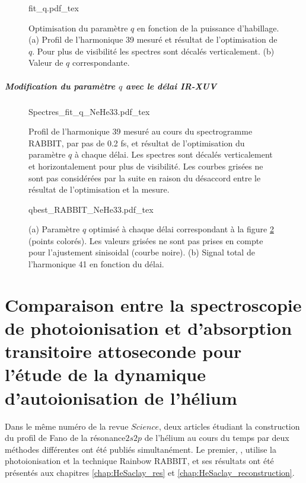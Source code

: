 \begin{figure}
\centering
\def\svgwidth{\textwidth}
{fit_q.pdf_tex}
\caption{Optimisation du paramètre $q$ en fonction de la puissance d'habillage. (a) Profil de l'harmonique 39 mesuré et résultat de l'optimisation de $q$. Pour plus de visibilité les spectres sont décalés verticalement. (b) Valeur de $q$ correspondante.}
\label{fig:fit_q}
\end{figure}

\paragraph*{Modification du paramètre $q$ avec le délai IR-XUV}
\begin{figure}[ht]
\centering
\def\svgwidth{\textwidth}
{Spectres_fit_q_NeHe33.pdf_tex}
\caption{Profil de l'harmonique 39 mesuré au cours du spectrogramme RABBIT, par pas de 0.2 fs, et résultat de l'optimisation du paramètre $q$ à chaque délai. Les spectres sont décalés verticalement et horizontalement pour plus de visibilité. Les courbes grisées ne sont pas considérées par la suite en raison du désaccord entre le résultat de l'optimisation et la mesure.}
\label{fig:Spectres_fit_q_NeHe33}
\end{figure}

\begin{figure}[ht]
\centering
\def\svgwidth{0.8\textwidth}
{qbest_RABBIT_NeHe33.pdf_tex}
\caption{(a) Paramètre $q$ optimisé à chaque délai correspondant à la figure \ref{fig:Spectres_fit_q_NeHe33} (points colorés). Les valeurs grisées ne sont pas prises en compte pour l'ajustement sinisoidal (courbe noire). (b) Signal total de l'harmonique 41 en fonction du délai.}
\label{fig:qbest_RABBIT_NeHe33}
\end{figure}






\chapter{Comparaison entre la spectroscopie de photoionisation et d'absorption transitoire attoseconde pour l'étude de la dynamique d'autoionisation de l'hélium}
Dans le même numéro de la revue $Science$, deux articles étudiant la construction du profil de Fano de la résonance$2s2p$ de l'hélium au cours du temps par deux méthodes différentes ont été publiés simultanément. Le premier, , utilise la photoionisation et la technique Rainbow RABBIT, et ses résultats ont été présentés aux chapitres \ref{chap:HeSaclay_res} et \ref{chap:HeSaclay_reconstruction}. 

